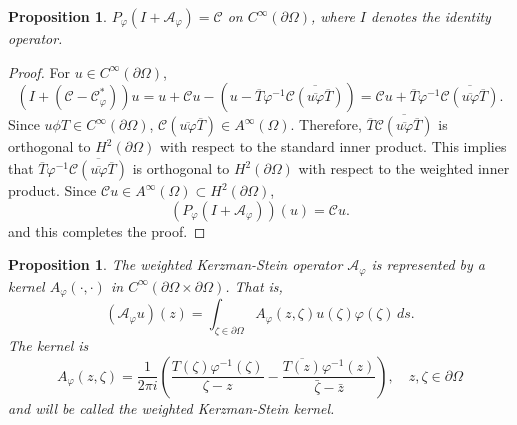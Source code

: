 \documentclass[11pt, reqno]{amsart}
\newtheorem{prop}[thm]{Proposition}
\numberwithin{equation}{section}
\begin{document}
\medskip

\begin{prop}\label{kzfor}
$P_{\varphi}(I+\mathcal{A}_{\varphi})=\mathcal{C}$ on $C^{\infty}(\partial\Omega)$,
where $I$ denotes the identity operator.
\end{prop}

\begin{proof}
For $u\in C^{\infty}(\partial\Omega)$, 
\[
\left(I+(\mathcal{C}-\mathcal{C}^*_{\varphi}) \right)u
=
u+\mathcal{C}u- \left(u-\overline{T}\varphi^{-1}\overline{\mathcal{C}(\overline{u\varphi}\overline{T})} \right)
=
\mathcal{C}u+\overline{T}\varphi^{-1}\overline{\mathcal{C}(\overline{u\varphi}\overline{T})}.
\]
Since $u\phi T\in C^{\infty}(\partial\Omega)$, $\mathcal{C}(\overline{u\varphi}\overline{T})\in A^{\infty}(\Omega)$. Therefore, $\overline{T}\overline{\mathcal{C}(\overline{u\varphi}\overline{T})}$ is orthogonal to $H^2(\partial\Omega)$ with respect to the standard inner product. This implies that $\overline{T}\varphi^{-1}\overline{\mathcal{C}(\overline{u\varphi}\overline{T})}$ is orthogonal to $H^2(\partial\Omega)$ with respect to the weighted inner product. Since $\mathcal{C}u\in A^{\infty}(\Omega)\subset H^2(\partial\Omega)$,
\begin{equation}
(P_{\varphi} (I+\mathcal{A}_{\varphi}))(u)=\mathcal{C}u.
\end{equation}
and this completes the proof. 
\end{proof}

\begin{prop}\label{kzkernel} The weighted Kerzman-Stein operator $\mathcal{A}_{\varphi}$ is represented by a kernel $A_{\varphi}(\cdot,\cdot)$ in $C^{\infty}(\partial\Omega\times\partial\Omega)$. That is,
\begin{equation}
(\mathcal{A}_{\varphi}u)(z)=\int_{\zeta\in\partial\Omega} A_{\varphi}(z,\zeta) u(\zeta)\varphi(\zeta)\,ds.
\end{equation}
The kernel is
\begin{equation}
A_{\varphi}(z,\zeta)=\frac{1}{2\pi i}\left(\frac{T(\zeta)\varphi^{-1}(\zeta)}{\zeta-z}-\frac{\overline{T(z)}\varphi^{-1}(z)}{\bar{\zeta}-\bar{z}}\right),\quad z,\zeta\in\partial\Omega
\end{equation}
and will be called the weighted Kerzman-Stein kernel.
\end{prop}
\end{document}
